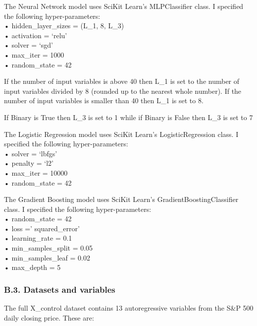 \documentclass[11pt,preprint, authoryear]{elsarticle}
\numberwithin{equation}{section}
\numberwithin{figure}{section}
\numberwithin{table}{section}
\begin{document}
The Neural Network model uses SciKit Learn's MLPClassifier class. I
specified the following hyper-parameters:\\
• hidden\_layer\_sizes = (L\_1, 8, L\_3)\\
• activation = `relu'\\
• solver = `sgd'\\
• max\_iter = 1000\\
• random\_state = 42

If the number of input variables is above 40 then L\_1 is set to the
number of input variables divided by 8 (rounded up to the nearest whole
number). If the number of input variables is smaller than 40 then L\_1
is set to 8.

If Binary is True then L\_3 is set to 1 while if Binary is False then
L\_3 is set to 7

The Logistic Regression model uses SciKit Learn's LogisticRegression
class. I specified the following hyper-parameters:\\
• solver = `lbfgs'\\
• penalty = `l2'\\
• max\_iter = 10000\\
• random\_state = 42

The Gradient Boosting model uses SciKit Learn's
GradientBoostingClassifier class. I specified the following
hyper-parameters:\\
• random\_state = 42\\
• loss =' squared\_error'\\
• learning\_rate = 0.1\\
• min\_samples\_split = 0.05\\
• min\_samples\_leaf = 0.02\\
• max\_depth = 5

\hypertarget{b.3.-datasets-and-variables}{%
\subsubsection*{B.3. Datasets and
variables}\label{b.3.-datasets-and-variables}}

The full X\_control dataset contains 13 autoregressive variables from
the S\&P 500 daily closing price. These are:
\end{document}

